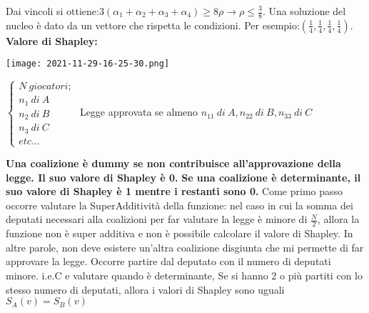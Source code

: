 \documentclass{article}
\theoremstyle{definition}
\theoremstyle{remark}
\begin{document}
Dai vincoli si ottiene:\(3(\alpha_1+\alpha_2+\alpha_3+\alpha_4)\geq 8\rho\rightarrow\rho\leq\frac{3}{8}\).\newline
Una soluzione del nucleo è dato da un vettore che rispetta le condizioni. Per esempio:\((\frac{1}{4},\frac{1}{4},\frac{1}{4},\frac{1}{4})\).\newline
\textbf{Valore di Shapley:}
\begin{center}
    \texttt{[image: 2021-11-29-16-25-30.png]}
\end{center}
\begin{center}
    $\begin{cases}
        N\ giocatori;\\
        n_1\ di\ A\\
        n_2\ di\ B\\
        n_3\ di\ C\\
        etc\dots
    \end{cases}$
    Legge approvata se almeno \(n_{11}\ di\ A, n_{22}\ di\ B, n_{33}\ di\ C\)
\end{center}
\textbf{Una coalizione è \textbf{dummy} se non contribuisce all'approvazione della legge. Il suo valore di Shapley è 0.}\newline
\textbf{Se una coalizione è determinante, il suo valore di Shapley è 1 mentre i restanti sono 0.}\newline
Come primo passo occorre valutare la SuperAdditività della funzione: nel caso in cui la somma dei deputati necessari alla coalizioni per far valutare la legge è minore di \(\frac{N}{2}\), allora
la funzione non è super additiva e non è possibile calcolare il valore di Shapley. In altre parole, non deve esistere un'altra coalizione disgiunta che mi permette di far approvare la legge.\newline
Occorre partire dal deputato con il numero di deputati minore. i.e.C e valutare quando è determinante,\newline
Se si hanno 2 o più partiti con lo stesso numero di deputati, allora i valori di Shapley sono uguali \(S_A(v)=S_B(v)\)
\end{document}
